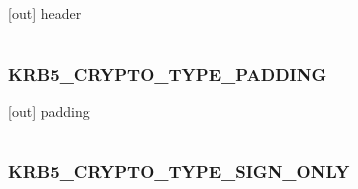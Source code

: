 \documentclass[letterpaper,10pt,english]{sphinxmanual}
\begin{document}
\begin{fulllineitems}
\label{appdev/refs/macros/KRB5_CRYPTO_TYPE_HEADER:KRB5_CRYPTO_TYPE_HEADER}
\end{fulllineitems}


{[}out{]} header

\begin{tabulary}{\linewidth}{|L|L|}
\hline

 & 
\\
\hline\end{tabulary}



\subsubsection{KRB5\_CRYPTO\_TYPE\_PADDING}
\label{appdev/refs/macros/KRB5_CRYPTO_TYPE_PADDING::doc}\label{appdev/refs/macros/KRB5_CRYPTO_TYPE_PADDING:krb5-crypto-type-padding-data}\label{appdev/refs/macros/KRB5_CRYPTO_TYPE_PADDING:krb5-crypto-type-padding}

\begin{fulllineitems}
\label{appdev/refs/macros/KRB5_CRYPTO_TYPE_PADDING:KRB5_CRYPTO_TYPE_PADDING}
\end{fulllineitems}


{[}out{]} padding

\begin{tabulary}{\linewidth}{|L|L|}
\hline

 & 
\\
\hline\end{tabulary}



\subsubsection{KRB5\_CRYPTO\_TYPE\_SIGN\_ONLY}
\label{appdev/refs/macros/KRB5_CRYPTO_TYPE_SIGN_ONLY:krb5-crypto-type-sign-only}\label{appdev/refs/macros/KRB5_CRYPTO_TYPE_SIGN_ONLY:krb5-crypto-type-sign-only-data}\label{appdev/refs/macros/KRB5_CRYPTO_TYPE_SIGN_ONLY::doc}

\begin{fulllineitems}
\label{appdev/refs/macros/KRB5_CRYPTO_TYPE_SIGN_ONLY:KRB5_CRYPTO_TYPE_SIGN_ONLY}
\end{fulllineitems}
\end{document}
